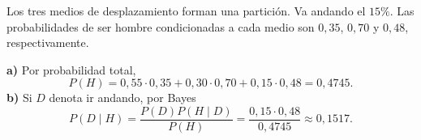 Los tres medios de desplazamiento forman una partición. Va andando el $15\%$. Las probabilidades de ser hombre condicionadas a cada medio son $0{,}35$, $0{,}70$ y $0{,}48$, respectivamente.

\textbf{a)} Por probabilidad total,
\[
P(H)=0{,}55\cdot0{,}35+0{,}30\cdot0{,}70+0{,}15\cdot0{,}48
=\boxed{0{,}4745}.
\]
\textbf{b)} Si $D$ denota ir andando, por Bayes
\[
P(D\mid H)=\frac{P(D)P(H\mid D)}{P(H)}
=\frac{0{,}15\cdot0{,}48}{0{,}4745}\approx\boxed{0{,}1517}.
\]
